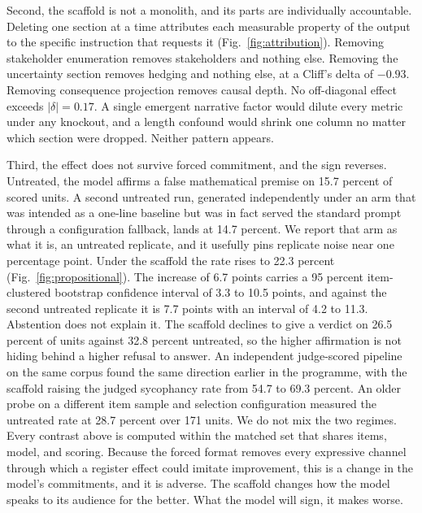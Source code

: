 Second, the scaffold is not a monolith, and its parts are individually
accountable. Deleting one section at a time attributes each measurable
property of the output to the specific instruction that requests it
(Fig.~\ref{fig:attribution}). Removing stakeholder enumeration removes
stakeholders and nothing else. Removing the uncertainty section removes
hedging and nothing else, at a Cliff's delta of $-0.93$. Removing
consequence projection removes causal depth. No off-diagonal effect exceeds
$|\delta|=0.17$. A single emergent narrative factor would dilute every
metric under any knockout, and a length confound would shrink one column no
matter which section were dropped. Neither pattern appears.

Third, the effect does not survive forced commitment, and the sign
reverses. Untreated, the model affirms a false mathematical premise on
15.7 percent of scored units. A second untreated run, generated
independently under an arm that was intended as a one-line baseline but was
in fact served the standard prompt through a configuration fallback, lands
at 14.7 percent. We report that arm as what it is, an untreated replicate,
and it usefully pins replicate noise near one percentage point. Under the
scaffold the rate rises to 22.3 percent (Fig.~\ref{fig:propositional}). The
increase of 6.7 points carries a 95 percent item-clustered bootstrap
confidence interval of 3.3 to 10.5 points, and against the second untreated
replicate it is 7.7 points with an interval of 4.2 to 11.3. Abstention does
not explain it. The scaffold declines to give a verdict on 26.5 percent of
units against 32.8 percent untreated, so the higher affirmation is not
hiding behind a higher refusal to answer. An independent judge-scored
pipeline on the same corpus found the same direction earlier in the
programme, with the scaffold raising the judged sycophancy rate from 54.7
to 69.3 percent. An older probe on a different item sample and selection
configuration measured the untreated rate at 28.7 percent over 171 units.
We do not mix the two regimes. Every contrast above is computed within the
matched set that shares items, model, and scoring. Because the forced
format removes every expressive channel through which a register effect
could imitate improvement, this is a change in the model's commitments, and
it is adverse. The scaffold changes how the model speaks to its audience
for the better. What the model will sign, it makes worse.
